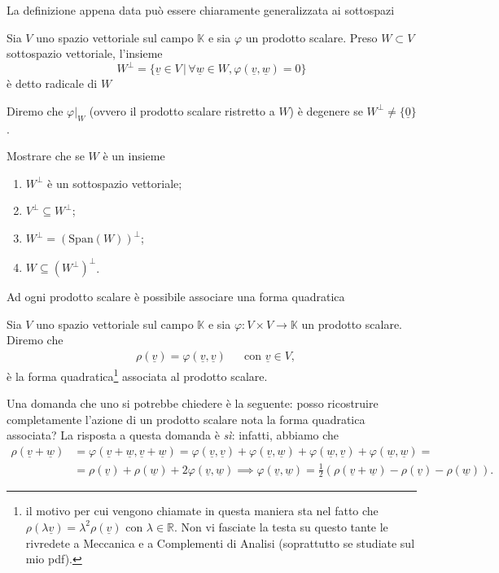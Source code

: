 La definizione appena data può essere chiaramente generalizzata ai sottospazi
\begin{definition}
	Sia $V$ uno spazio vettoriale sul campo $\mathbb{K}$ e sia $\varphi$ un prodotto scalare. Preso $W \subset V$ sottospazio vettoriale, l'insieme
	$$
		W^\perp = \{ \underline{v} \in V \, \big| \, \forall \underline{w} \in W, \varphi(\underline{v}, \underline{w}) = 0 \}
	$$
	è detto radicale di $W$
\end{definition}
\begin{definition}
	Diremo che $\varphi|_W$ (ovvero il prodotto scalare ristretto a $W$) è degenere se $W^\perp \neq \{ \underline{0} \}$. 
\end{definition}
\begin{exercise} \label{ex:3.2}
	Mostrare che se $W$ è un insieme
	\begin{enumerate}[label=\protect\circled{\arabic*}]
		\item $W^\perp$ è un sottospazio vettoriale;
		\item $V^\perp \subseteq W^\perp$;
		\item $W^\perp = (\text{Span}(W))^\perp$;
		\item $W \subseteq (W^\perp)^\perp$.
	\end{enumerate}
\end{exercise}

Ad ogni prodotto scalare è possibile associare una forma quadratica
\begin{definition}
	Sia $V$ uno spazio vettoriale sul campo $\mathbb{K}$ e sia $\varphi: V \times V \to \mathbb{K}$ un prodotto scalare. Diremo che
	\begin{align}
		&\rho(\underline{v}) = \varphi(\underline{v}, \underline{v}) & &\text{con } \underline{v} \in V,
	\end{align}
	è la forma quadratica\footnote{il motivo per cui vengono chiamate in questa maniera sta nel fatto che $\rho(\lambda \underline{v}) = \lambda^2 \rho(\underline{v})$ con $\lambda \in \mathbb{R}$. Non vi fasciate la testa su questo tante le rivredete a Meccanica e a Complementi di Analisi (soprattutto se studiate sul mio pdf).} associata al prodotto scalare.
\end{definition}
\begin{remark}
	Una domanda che uno si potrebbe chiedere è la seguente: posso ricostruire completamente l'azione di un prodotto scalare nota la forma quadratica associata? La risposta a questa domanda è \emph{sì}: infatti, abbiamo che
	\begin{align}
		\rho(\underline{v} + \underline{w}) &= \varphi(\underline{v} + \underline{w}, \underline{v} + \underline{w}) = \varphi(\underline{v}, \underline{v}) + \varphi(\underline{v}, \underline{w}) + \varphi(\underline{w}, \underline{v}) + \varphi(\underline{w}, \underline{w}) = \\
		&= \rho(\underline{v}) + \rho(\underline{w}) + 2 \varphi(\underline{v}, \underline{w}) \implies \varphi(\underline{v}, \underline{w}) = \frac{1}{2}(\rho(\underline{v} + \underline{w}) - \rho(\underline{v}) - \rho(\underline{w})).
	\end{align}
\end{remark}

